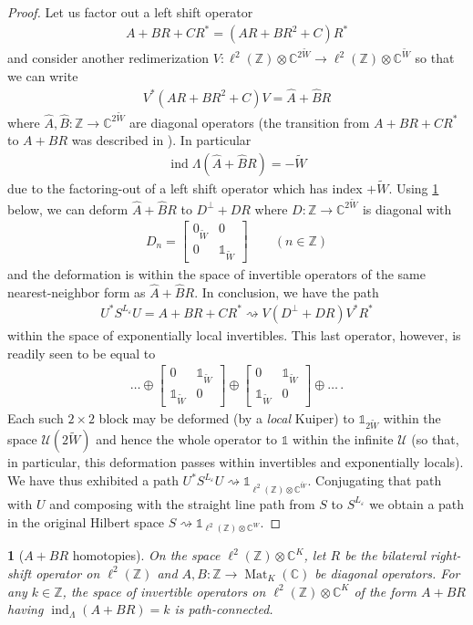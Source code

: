\documentclass[a4paper,10pt]{article}
\numberwithin{equation}{section}
\theoremstyle{plain}
\theoremstyle{plain}
\newtheorem{lem}[thm]{\protect\lemmaname}
\theoremstyle{plain}
\theoremstyle{plain}
\theoremstyle{plain}
\theoremstyle{remark}
\theoremstyle{definition}
\theoremstyle{plain}
\providecommand{\lemmaname}{Lemma}
\newcommand{\Mat}{\operatorname{Mat}}
\newcommand{\ZZ}{\mathbb{Z}}
\newcommand{\CC}{\mathbb{C}}
\newcommand{\calU}{\mathcal{U}}
\newcommand{\bbLambda}{\mathbb{\Lambda}}
\newcommand{\ti}[1]{\widetilde{#1}}
\newcommand{\ve}{\varepsilon}
\newcommand{\Id}{\mathds{1}}
\newcommand{\findex}{\operatorname{ind}}
\newcommand{\eq}[1]{\begin{align*}#1\end{align*}}
\begin{document}
\begin{proof}
		Let us factor out a left shift operator \eq{A+BR+CR^\ast = (AR + BR^2 + C)R^\ast} and consider another redimerization $V:\ell^2(\ZZ)\otimes \CC^{2\ti{W}}\to \ell^2(\ZZ)\otimes \CC^{\ti{W}}$ so that we can write \eq{V^* (AR + BR^2 + C)V = \widehat{A}+\widehat{B}R} where $\widehat{A},\widehat{B}:\ZZ\to \CC^{2\ti{W}}$ are diagonal operators (the transition from $A+BR+CR^\ast$ to $A+BR$ was described in \cite[Example 1]{Graf_Shapiro_2018_1D_Chiral_BEC}). In particular \eq{\findex \bbLambda (\widehat{A}+\widehat{B}R)=-\ti{W}} due to the factoring-out of a left shift operator which has index $+\ti W$. Using \cref{lem:A+BR homotopies} below, we can deform $\widehat{A}+\widehat{B}R$ to $D^\perp+DR$ where $D:\ZZ\to\CC^{2\ti{W}}$ is diagonal with \eq{D_n=\begin{bmatrix}0_{\ti{W}} & 0 \\ 0 & \Id_{\ti{W}}\end{bmatrix}\qquad(n\in\ZZ)} and the deformation is within the space of invertible operators of the same nearest-neighbor form as $\widehat{A}+\widehat{B}R$. In conclusion, we have the path \eq{U^\ast S^{L_\ve} U = A+BR+CR^\ast\rightsquigarrow V(D^\perp +DR)V^*R^*} within the space of exponentially local invertibles. This last operator, however, is readily seen to be equal to \eq{\dots\oplus\begin{bmatrix}
				0 & \Id_{\ti W} \\ \Id_{\ti W} & 0
			\end{bmatrix}\oplus\begin{bmatrix}
				0 & \Id_{\ti W} \\ \Id_{\ti W} & 0
			\end{bmatrix}\oplus \dots\,.} Each such $2\times 2$ block may be deformed (by a \emph{local} Kuiper) to $\Id_{2\ti W}$ within the space $\calU(2\ti W)$ and hence the whole operator to $\Id$ within the infinite $\calU$ (so that, in particular, this deformation passes within invertibles and exponentially locals). We have thus exhibited a path $U^\ast S^{L_\ve} U\rightsquigarrow\Id_{\ell^2(\ZZ)\otimes\CC^{\ti W}}$. Conjugating that path with $U$ and composing with the straight line path from $S$ to $S^{L_\ve}$ we obtain a path in the original Hilbert space $S\rightsquigarrow \Id_{\ell^2(\ZZ)\otimes\CC^{W}}$.
	\end{proof}
	
	
	
	\begin{lem}[$A+BR$ homotopies]\label{lem:A+BR homotopies}
		On the space $\ell^2(\ZZ)\otimes \CC^K$, let $R$ be the bilateral right-shift operator on $\ell^2(\ZZ)$ and $A,B:\ZZ\to \Mat_K(\CC)$ be diagonal operators.  For any $k\in\ZZ$, the space of invertible operators on $\ell^2(\ZZ)\otimes \CC^K$ of the form $A+BR$ having $\findex_\Lambda(A+BR)=k$ is path-connected.
	\end{lem}
	
\end{document}
